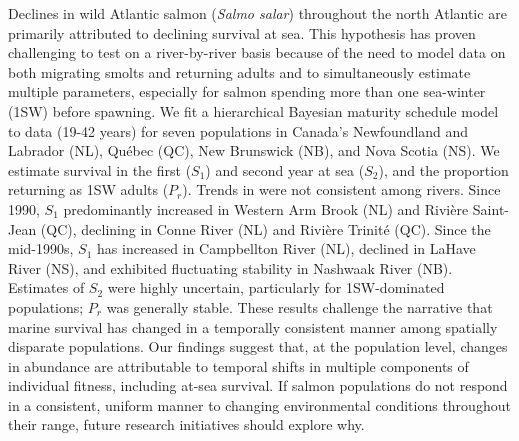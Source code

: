 \documentclass[12pt]{article}
\newcommand{\So}{$S_{1}$\xspace}
\newcommand{\St}{$S_{2}$\xspace}
\newcommand{\Pg}{$P_r$\xspace}
\begin{document}
Declines in wild Atlantic salmon (\emph{Salmo salar}) throughout the north
Atlantic are primarily attributed to declining survival at sea. This
hypothesis has proven challenging to test on a river-by-river basis because of
the need to model data on both migrating smolts and returning adults and to
simultaneously estimate multiple parameters, especially for salmon spending
more than one sea-winter (1SW) before spawning. We fit a hierarchical Bayesian
maturity schedule model to data (19-42 years) for seven populations in Canada's
Newfoundland and Labrador (NL), Qu\'{e}bec (QC), New Brunswick (NB), and Nova
Scotia (NS). We estimate survival in the first (\So) and second year at sea (\St),
and the proportion returning as 1SW adults (\Pg). Trends in  were not consistent
among rivers. Since 1990, \So predominantly increased in Western Arm Brook (NL)
and Rivi\`{e}re Saint-Jean (QC), declining in Conne River (NL) and Rivière
Trinité (QC). Since the mid-1990s, \So has increased in Campbellton River (NL),
declined in LaHave River (NS), and exhibited fluctuating stability in Nashwaak
River (NB). Estimates of \St were highly uncertain, particularly for
1SW-dominated populations; \Pg was generally stable. These results challenge the
narrative that marine survival has changed in a temporally consistent manner
among spatially disparate populations. Our findings suggest that, at the
population level, changes in abundance are attributable to temporal shifts in
multiple components of individual fitness, including at-sea survival. If
salmon populations do not respond in a consistent, uniform manner to changing
environmental conditions throughout their range, future research initiatives
should explore why.
\end{document}
